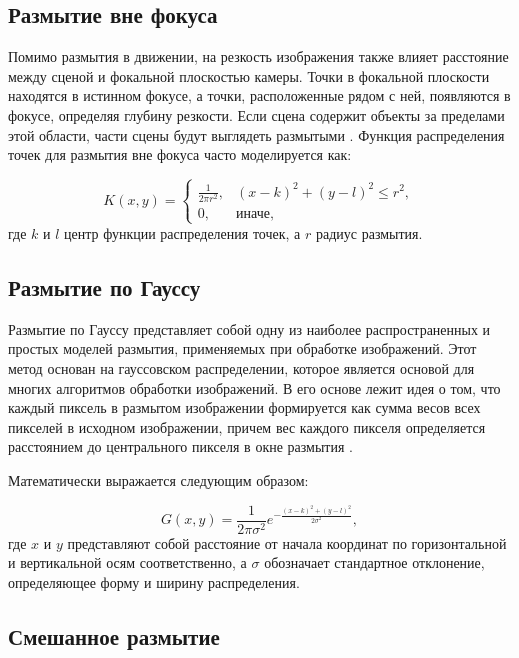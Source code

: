 \subsection{Размытие вне фокуса}

Помимо размытия в движении, на резкость изображения также влияет расстояние между сценой и фокальной плоскостью камеры. Точки в фокальной плоскости находятся в истинном фокусе, а точки, расположенные рядом с ней, появляются в фокусе, определяя глубину резкости. Если сцена содержит объекты за пределами этой области, части сцены будут выглядеть размытыми \cite{zhang2020deblurring}. Функция распределения точек для размытия вне фокуса часто моделируется как:

\begin{equation}\label{eq:deblurring}
	K(x, y) = \begin{cases}
		\frac{1}{2 \pi r^2}, & (x - k)^2 + (y - l)^2 \leq r^2, \\
		0, & \text{иначе},
	\end{cases}
\end{equation}
где \(k\) и \(l\) центр функции распределения точек, а \(r\) радиус размытия.

\subsection{Размытие по Гауссу}

Размытие по Гауссу представляет собой одну из наиболее распространенных и простых моделей размытия, применяемых при обработке изображений. Этот метод основан на гауссовском распределении, которое является основой для многих алгоритмов обработки изображений. В его основе лежит идея о том, что каждый пиксель в размытом изображении формируется как сумма весов всех пикселей в исходном изображении, причем вес каждого пикселя определяется расстоянием до центрального пикселя в окне размытия \cite{chen2009empirical}.

Математически выражается следующим образом:

\begin{equation}
	G(x, y) = \frac{1}{2 \pi \sigma^2} e^{-\frac{(x - k)^2 + (y - l)^2}{2 \sigma^2}},
\end{equation}
где \(x\) и \(y\) представляют собой расстояние от начала координат по горизонтальной и вертикальной осям соответственно, а \(\sigma\) обозначает стандартное отклонение, определяющее форму и ширину распределения.
\subsection{Смешанное размытие}

